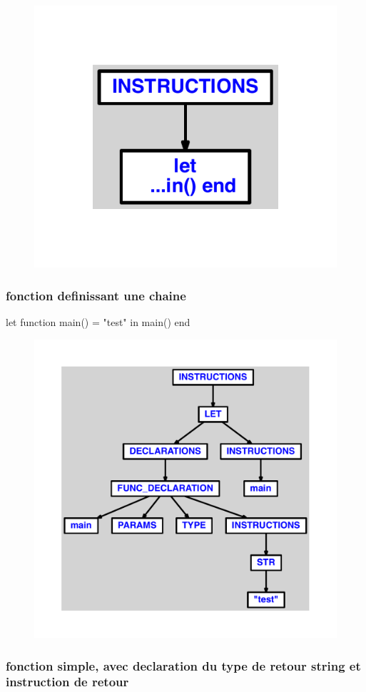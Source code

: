 \documentclass{article}
\begin{document}
\begin{figure}[H]\centering\includegraphics[max width=\textwidth]{ast/ast_227.pdf}\end{figure}\subsubsection{fonction definissant une chaine}
\begin{verbatimtab}
let
	function main() = "test"
in main() end
\end{verbatimtab}
\begin{figure}[H]\centering\includegraphics[max width=\textwidth]{ast/ast_228.pdf}\end{figure}\subsubsection{fonction simple, avec declaration du type de retour string et instruction de retour}
\end{document}
